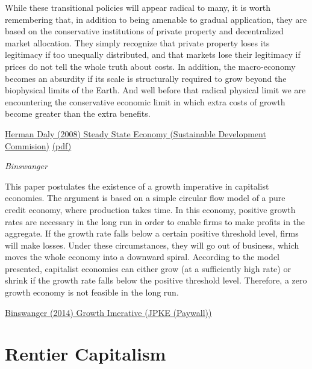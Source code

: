\documentclass[
]{book}
\begin{document}
While these transitional policies will appear radical to many, it is worth remembering that, in addition to being
amenable to gradual application, they are based on the conservative institutions of private property and decentralized
market allocation. They simply recognize that private property loses its legitimacy if too unequally distributed, and
that markets lose their legitimacy if prices do not tell the whole truth about costs. In addition, the macro-economy
becomes an absurdity if its scale is structurally required to grow beyond the biophysical limits of the Earth. And well
before that radical physical limit we are encountering the conservative economic limit in which extra costs of growth
become greater than the extra benefits.

\href{http://www.sd-commission.org.uk/publications.php@id=775.html}{Herman Daly (2008) Steady State Economy (Sustainable Development Commision)}
\href{pdf/Daly_2008_Steady_State_Economy_SD_Commision.pdf}{(pdf)}

\emph{Binswanger}

This paper postulates the existence of a growth imperative in capitalist economies. The argument is based on a simple circular flow model of a pure credit economy, where production takes time. In this economy, positive growth rates are necessary in the long run in order to enable firms to make profits in the aggregate. If the growth rate falls below a certain positive threshold level, firms will make losses. Under these circumstances, they will go out of business, which moves the whole economy into a downward spiral. According to the model presented, capitalist economies can either grow (at a sufficiently high rate) or shrink if the growth rate falls below the positive threshold level. Therefore, a zero growth economy is not feasible in the long run.

\href{https://www.tandfonline.com/doi/abs/10.2753/PKE0160-3477310410}{Binswanger (2014) Growth Imerative (JPKE (Paywall))}

\hypertarget{rentier-capitalism}{%
\chapter{Rentier Capitalism}\label{rentier-capitalism}}
\end{document}
